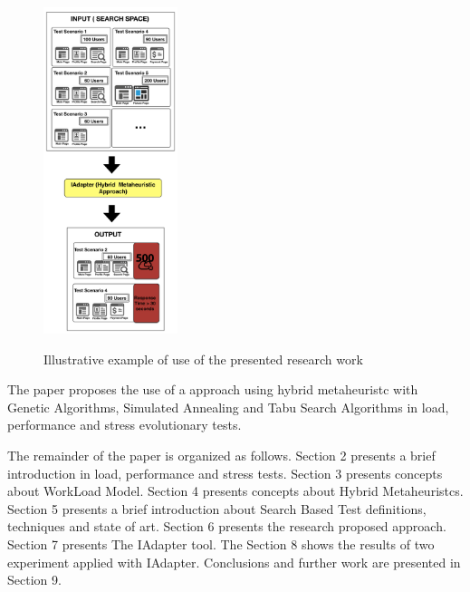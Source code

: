 \begin{figure}[ht]
\centering
\caption{Illustrative example of use of the presented research work}
\includegraphics[width=0.35\textwidth]{./images/solution.png}
\label{fig:solution}
\end{figure}



%
%
%
The paper proposes the use of a approach using  hybrid metaheuristc  with  Genetic Algorithms, Simulated Annealing and Tabu Search Algorithms  in load, performance and stress evolutionary tests.

The remainder of the paper is organized as follows. Section 2 presents a brief introduction in load, performance and stress tests. Section 3 presents concepts about WorkLoad Model. Section 4 presents concepts about Hybrid Metaheuristcs. Section 5 presents a brief introduction about Search Based Test definitions, techniques and state of art. Section 6 presents the research proposed approach. Section 7 presents The IAdapter tool. The Section 8 shows the results of two experiment applied with IAdapter. Conclusions and further work are presented in Section 9.